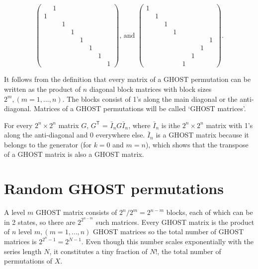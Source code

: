 \documentclass[12pt]{article}
\begin{document}
  \begin{equation*}
    \left( \begin{array}{cccccccc}
        & 1 & & & & & & \\
        1 & & & & & & & \\
        & & 1 & & & & & \\
        & & & 1 & & & & \\
        & & & & 1 & & & \\
        & & & & & 1 & & \\
        & & & & & & 1 & \\
        & & & & & & & 1
    \end{array}
    \right) \text{, and }
    \left( \begin{array}{cccccccc}
        1 & & & & & & & \\
        & 1 & & & & & & \\
        & & 1 & & & & & \\
        & & & 1 & & & & \\
        & & & & & & & 1 \\
        & & & & & & 1 & \\
        & & & & & 1 & & \\
        & & & & 1 & & & 
    \end{array}
    \right).
  \end{equation*}

  It follows from the definition that every matrix of a GHOST
  permutation can be written as the product of $n$ diagonal block
  matrices with block sizes $2^m, (m = 1, ..., n)$. The blocks consist
  of 1's along the main diagonal or the anti-diagonal. Matrices
  of a GHOST permutations will be called `GHOST matrices'.

  For every $2^n \times 2^n$ matrix $G$, $G^{\mathsf{T}}$ =
  $\bar{I}_nG\bar{I}_n$, where $\bar{I}_n$ is ithe $2^n \times 2^n$
  matrix with 1's along the anti-diagonal and 0 everywhere else.
  $\bar{I}_n$ is a GHOST matrix because it belongs to the generator
  (for $k=0$ and $m=n$), which shows that the transpose of a GHOST
  matrix is also a GHOST matrix.

  \section{Random GHOST permutations}

  A level $m$ GHOST matrix consists of $2^n / 2^m = 2^{n-m}$ blocks,
  each of which can be in 2 states, so there are $2^{2^{n-m}}$
  such matrices. Every GHOST matrix is the  product of $n$ level
  $m, (m=1, ..., n)$ GHOST matrices so the total number of GHOST
  matrices is $2^{2^n - 1} = 2^{N-1}$. Even though this number
  scales exponentially with the series length $N$, it constitutes
  a tiny fraction of $N!$, the total number of permutations of $X$.
\end{document}
